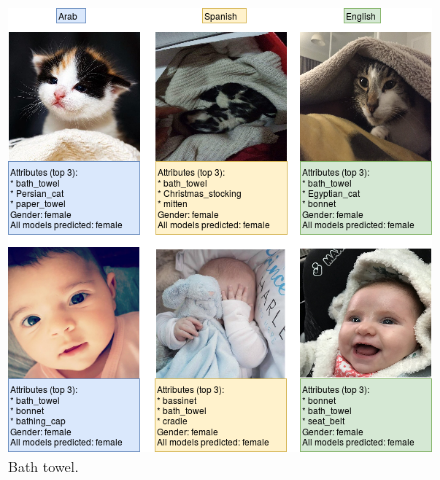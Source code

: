 \documentclass[runningheads]{llncs}
\begin{document}
\begin{figure}[!ht]
    \centering
    \includegraphics[scale=0.37]{img/best_gi/bath_towel_gi.png}
    \caption{Bath towel.}
    \label{fig:towel}
\end{figure}
\end{document}
